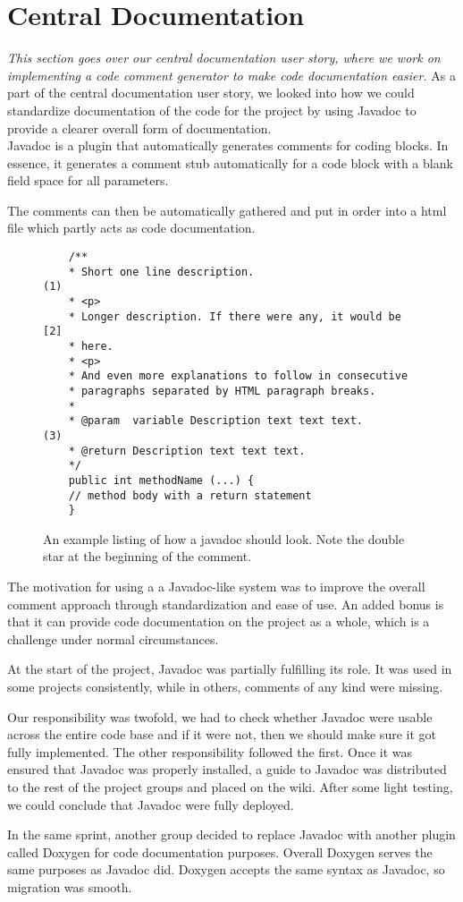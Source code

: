 \section{Central Documentation} \label{Sprint1_SecJavadocs}
\textit{This section goes over our central documentation user story, where we work on implementing a code comment generator to make code documentation easier.}
As a part of the central documentation user story, we looked into how we could standardize documentation of the code for the project by using Javadoc to provide a clearer overall form of documentation.\\
Javadoc is a plugin that automatically generates comments for coding blocks. In essence, it generates a comment stub automatically for a code block with a blank field space for all parameters. \citep{JavadocSource}

The comments can then be automatically gathered and put in order into a html file which partly acts as code documentation.\\
\begin{figure}[H]
	\begin{lstlisting}
	/**
	* Short one line description.                           (1)
	* <p>
	* Longer description. If there were any, it would be    [2]
	* here.
	* <p>
	* And even more explanations to follow in consecutive
	* paragraphs separated by HTML paragraph breaks.
	*
	* @param  variable Description text text text.          (3)
	* @return Description text text text.
	*/
	public int methodName (...) {
	// method body with a return statement
	}
	\end{lstlisting}
	\caption{An example listing of how a javadoc should look. Note the double star at the beginning of the comment.}
	\label{JavadocExample}
\end{figure}

The motivation for using a a Javadoc-like system was to improve the overall comment approach through standardization and ease of use. An added bonus is that it can provide code documentation on the project as a whole, which is a challenge under normal circumstances.

At the start of the project, Javadoc was partially fulfilling its role. It was used in some projects consistently, while in others, comments of any kind were missing.

Our responsibility was twofold, we had to check whether Javadoc were usable across the entire code base and if it were not, then we should make sure it got fully implemented. The other responsibility followed the first. Once it was ensured that Javadoc was properly installed, a guide to Javadoc was distributed to the rest of the project groups and placed on the wiki. After some light testing, we could conclude that Javadoc were fully deployed.

In the same sprint, another group decided to replace Javadoc with another plugin called Doxygen for code documentation purposes. Overall Doxygen serves the same purposes as Javadoc did.
Doxygen accepts the same syntax as Javadoc, so migration was smooth.
